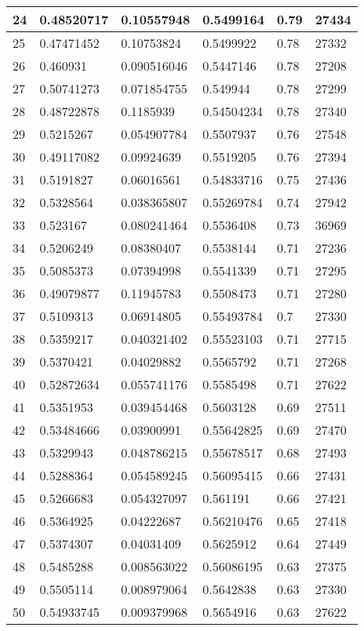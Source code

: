 \begin{longtable}{|l|l|l|l|l|l|}
24 & 0.48520717 & 0.10557948 & 0.5499164 & 0.79 & 27434 \\ \hline 
25 & 0.47471452 & 0.10753824 & 0.5499922 & 0.78 & 27332 \\ \hline 
26 & 0.460931 & 0.090516046 & 0.5447146 & 0.78 & 27208 \\ \hline 
27 & 0.50741273 & 0.071854755 & 0.549944 & 0.78 & 27299 \\ \hline 
28 & 0.48722878 & 0.1185939 & 0.54504234 & 0.78 & 27340 \\ \hline 
29 & 0.5215267 & 0.054907784 & 0.5507937 & 0.76 & 27548 \\ \hline 
30 & 0.49117082 & 0.09924639 & 0.5519205 & 0.76 & 27394 \\ \hline 
31 & 0.5191827 & 0.06016561 & 0.54833716 & 0.75 & 27436 \\ \hline 
32 & 0.5328564 & 0.038365807 & 0.55269784 & 0.74 & 27942 \\ \hline 
33 & 0.523167 & 0.080241464 & 0.5536408 & 0.73 & 36969 \\ \hline 
34 & 0.5206249 & 0.08380407 & 0.5538144 & 0.71 & 27236 \\ \hline 
35 & 0.5085373 & 0.07394998 & 0.5541339 & 0.71 & 27295 \\ \hline 
36 & 0.49079877 & 0.11945783 & 0.5508473 & 0.71 & 27280 \\ \hline 
37 & 0.5109313 & 0.06914805 & 0.55493784 & 0.7 & 27330 \\ \hline 
38 & 0.5359217 & 0.040321402 & 0.55523103 & 0.71 & 27715 \\ \hline 
39 & 0.5370421 & 0.04029882 & 0.5565792 & 0.71 & 27268 \\ \hline 
40 & 0.52872634 & 0.055741176 & 0.5585498 & 0.71 & 27622 \\ \hline 
41 & 0.5351953 & 0.039454468 & 0.5603128 & 0.69 & 27511 \\ \hline 
42 & 0.53484666 & 0.03900991 & 0.55642825 & 0.69 & 27470 \\ \hline 
43 & 0.5329943 & 0.048786215 & 0.55678517 & 0.68 & 27493 \\ \hline 
44 & 0.5288364 & 0.054589245 & 0.56095415 & 0.66 & 27431 \\ \hline 
45 & 0.5266683 & 0.054327097 & 0.561191 & 0.66 & 27421 \\ \hline 
46 & 0.5364925 & 0.04222687 & 0.56210476 & 0.65 & 27418 \\ \hline 
47 & 0.5374307 & 0.04031409 & 0.5625912 & 0.64 & 27449 \\ \hline 
48 & 0.5485288 & 0.008563022 & 0.56086195 & 0.63 & 27375 \\ \hline 
49 & 0.5505114 & 0.008979064 & 0.5642838 & 0.63 & 27330 \\ \hline 
50 & 0.54933745 & 0.009379968 & 0.5654916 & 0.63 & 27622 \\ \hline 
\end{longtable}